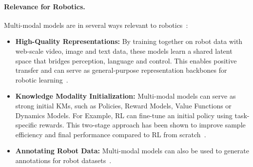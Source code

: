 \paragraph{Relevance for Robotics.}
Multi-modal models are in several ways relevant to robotics~\cite{McCarthy_2025, Eze2024LearningBW}:
\begin{itemize}
    \item \textbf{High-Quality Representations:} By training together on robot data with web-scale video, image and text data, these models learn a shared latent space that bridges perception, language and control. This enables positive transfer and can serve as general-purpose representation backbones for robotic learning~\cite{Kawaharazuka2025VisionLanguageActionMF}.
    
    \item \textbf{Knowledge Modality Initialization:} Multi-modal models can serve as strong initial \acp{KM}, such as Policies, Reward Models, Value Functions or Dynamics Models. For Example, \ac{RL} can fine-tune an initial policy  using task-specific rewards. This two-stage approach has been shown to improve sample efficiency and final performance compared to \ac{RL} from scratch~\cite{Kawaharazuka2025VisionLanguageActionMF}.
    \item \textbf{Annotating Robot Data:} Multi-modal models can also be used to generate annotations for robot datasets~\cite{Sun2024EmmaXAE, Zawalski2024RoboticCV}.
    
\end{itemize}

